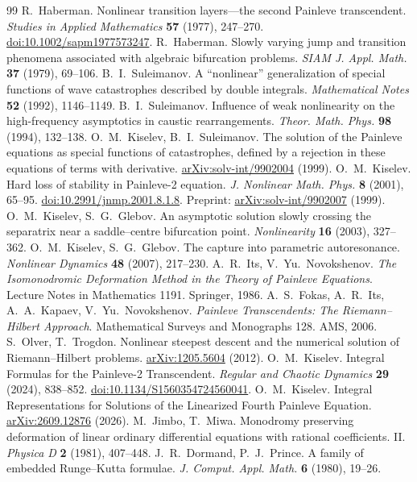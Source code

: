\begin{thebibliography}{99}
 R.~Haberman. Nonlinear transition layers---the second
Painleve transcendent. \emph{Studies in Applied Mathematics} \textbf{57}
(1977), 247--270. \href{https://doi.org/10.1002/sapm1977573247}{doi:10.1002/sapm1977573247}.
 R.~Haberman. Slowly varying jump and transition phenomena
associated with algebraic bifurcation problems. \emph{SIAM J. Appl. Math.}
\textbf{37} (1979), 69--106.
 B.~I.~Suleimanov. A ``nonlinear'' generalization of
special functions of wave catastrophes described by double integrals.
\emph{Mathematical Notes} \textbf{52} (1992), 1146--1149.
 B.~I.~Suleimanov. Influence of weak nonlinearity on the
high-frequency asymptotics in caustic rearrangements.
\emph{Theor. Math. Phys.} \textbf{98} (1994), 132--138.
 O.~M.~Kiselev, B.~I.~Suleimanov.
The solution of the Painleve equations as special functions of catastrophes,
defined by a rejection in these equations of terms with derivative.
\href{https://arxiv.org/abs/solv-int/9902004}{arXiv:solv-int/9902004} (1999).
 O.~M.~Kiselev. Hard loss of stability in Painleve-2 equation.
\emph{J. Nonlinear Math. Phys.} \textbf{8} (2001), 65--95.
\href{https://doi.org/10.2991/jnmp.2001.8.1.8}{doi:10.2991/jnmp.2001.8.1.8}.
Preprint: \href{https://arxiv.org/abs/solv-int/9902007}{arXiv:solv-int/9902007} (1999).
 O.~M.~Kiselev, S.~G.~Glebov.
An asymptotic solution slowly crossing the separatrix near a saddle--centre
bifurcation point. \emph{Nonlinearity} \textbf{16} (2003), 327--362.
 O.~M.~Kiselev, S.~G.~Glebov.
The capture into parametric autoresonance. \emph{Nonlinear Dynamics}
\textbf{48} (2007), 217--230.
 A.~R.~Its, V.~Yu.~Novokshenov.
\emph{The Isomonodromic Deformation Method in the Theory of Painleve Equations}.
Lecture Notes in Mathematics 1191. Springer, 1986.
 A.~S.~Fokas, A.~R.~Its, A.~A.~Kapaev, V.~Yu.~Novokshenov.
\emph{Painleve Transcendents: The Riemann--Hilbert Approach}.
Mathematical Surveys and Monographs 128. AMS, 2006.
 S.~Olver, T.~Trogdon.
Nonlinear steepest descent and the numerical solution of Riemann--Hilbert problems.
\href{https://arxiv.org/abs/1205.5604}{arXiv:1205.5604} (2012).
 O.~M.~Kiselev. Integral Formulas for the Painleve-2 Transcendent.
\emph{Regular and Chaotic Dynamics} \textbf{29} (2024), 838--852.
\href{https://doi.org/10.1134/S1560354724560041}{doi:10.1134/S1560354724560041}.
 O.~M.~Kiselev.
Integral Representations for Solutions of the Linearized Fourth Painleve Equation.
\href{https://arxiv.org/abs/2609.12876}{arXiv:2609.12876} (2026).
 M.~Jimbo, T.~Miwa. Monodromy preserving deformation of
linear ordinary differential equations with rational coefficients. II.
\emph{Physica D} \textbf{2} (1981), 407--448.
 J.~R.~Dormand, P.~J.~Prince.
A family of embedded Runge--Kutta formulae.
\emph{J. Comput. Appl. Math.} \textbf{6} (1980), 19--26.
\end{thebibliography}
